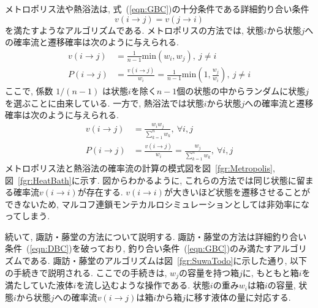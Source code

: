メトロポリス法や熱浴法は, 式~(\ref{eqn:GBC})の十分条件である詳細釣り合い条件
\begin{equation}
 v(i \to j) = v(j \to i)
  \label{eqn:DBC}
\end{equation}
を満たすようなアルゴリズムである.
メトロポリスの方法では, 状態$i$から状態$j$への確率流と遷移確率は次のように与えられる.
\begin{align}
	 v(i \to j) &=
	 \frac{1}{n-1} \mathrm{min} \left( w_i,w_j \right),~ j \neq i
	 \label{eqn:nu_MP}
	 \\
	 P(i \to j) &=
	 \frac{v(i \to j)}{w_{i}} = \frac{1}{n-1}\mathrm{min}\left(1,\frac{w_{j}}{w_{i}}\right), ~j \neq i
	 \label{eqn:MP_P}
\end{align}
ここで, 係数 $1/(n-1)$ は状態$i$を除く$n-1$個の状態の中からランダムに状態$j$を選ぶことに由来している.
一方で, 熱浴法では状態$i$から状態$j$への確率流と遷移確率は次のように与えられる.
\begin{align}
	 v(i \to j) &=
	 \frac{w_{i}w_{j}}{\sum_{k=1}^{n} w_{k}},~ \forall i, j
	 \label{eqn:nu_HB}
	 \\
	 P(i \to j) &=
	 \frac{v(i \to j)}{w_{i}} = \frac{w_{j}}{\sum_{k=1}^{n} w_{k}}, ~ \forall i, j \label{eqn:HB_P}
\end{align}
メトロポリス法と熱浴法の確率流の計算の模式図を図~\ref{fgr:Metropolis}, 図~\ref{fgr:HeatBath}に示す.
図からわかるように, これらの方法では同じ状態に留まる確率流$v(i \to i)$が存在する.
$v(i \to i)$が大きいほど状態を遷移させることができないため, マルコフ連鎖モンテカルロシミュレーションとしては非効率になってしまう.

続いて, 諏訪・藤堂の方法について説明する.
諏訪・藤堂の方法は詳細釣り合い条件~(\ref{eqn:DBC})を破っており, 釣り合い条件~(\ref{eqn:GBC})のみ満たすアルゴリズムである.
諏訪・藤堂のアルゴリズムは図~\ref{fgr:SuwaTodo}に示した通り, 以下の手続きで説明される.
ここでの手続きは, $w_{j}$の容量を持つ箱$j$に, もともと箱$i$を満たしていた液体$i$を流し込むような操作である.
状態$i$の重み$w_{i}$は箱$i$の容量, 状態$i$から状態$j$への確率流$v(i \to j)$は箱$i$から箱$j$に移す液体の量に対応する.


